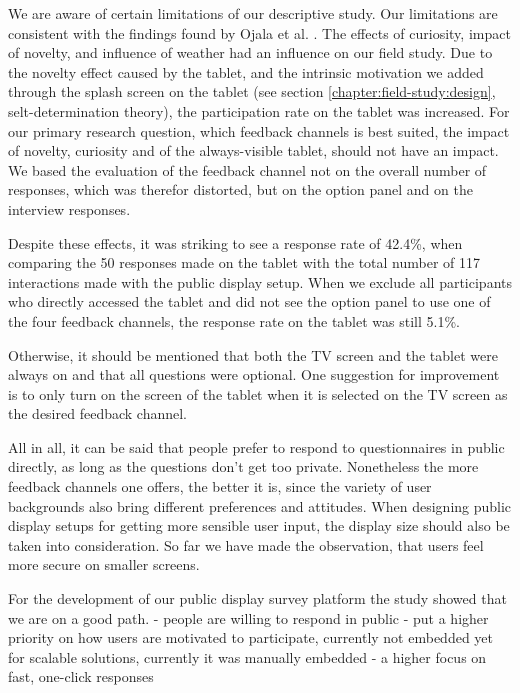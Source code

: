 
	We are aware of certain limitations of our descriptive study. Our limitations are consistent with the findings found by Ojala et al. \cite{Ojala2011}. The effects of curiosity, impact of novelty, and influence of weather had an influence on our field study. Due to the novelty effect caused by the tablet, and the intrinsic motivation we added through the splash screen on the tablet (see section \ref{chapter:field-study:design}, selt-determination theory), the participation rate on the tablet was increased. For our primary research question, which feedback channels is best suited, the impact of novelty, curiosity and of the always-visible tablet, should not have an impact. We based the evaluation of the feedback channel not on the overall number of responses, which was therefor distorted, but on the option panel and on the interview responses.

	Despite these effects, it was striking to see a response rate of 42.4\%, when comparing the 50 responses made on the tablet with the total number of 117 interactions made with the public display setup. When we exclude all participants who directly accessed the tablet and did not see the option panel to use one of the four feedback channels, the response rate on the tablet was still 5.1\%. 

	Otherwise, it should be mentioned that both the TV screen and the tablet were always on and that all questions were optional. One suggestion for improvement is to only turn on the screen of the tablet when it is selected on the TV screen as the desired feedback channel.



	All in all, it can be said that people prefer to respond to questionnaires in public directly, as long as the questions don't get too private. Nonetheless the more feedback channels one offers, the better it is, since the variety of user backgrounds also bring different preferences and attitudes. When designing public display setups for getting more sensible user input, the display size should also be taken into consideration. So far we have made the observation, that users feel more secure on smaller screens.	


	For the development of our public display survey platform the study showed that we are on a good path. 
		- people are willing to respond in public
		- put a higher priority on how users are motivated to participate, currently not embedded yet for scalable solutions, currently it was manually embedded
		- a higher focus on fast, one-click responses





